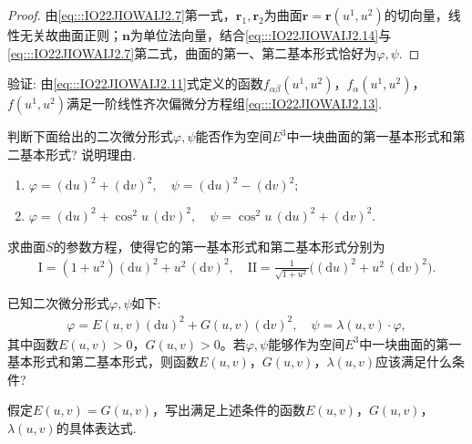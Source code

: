\documentclass[../../main.tex]{subfiles}%
\begin{document}
\begin{proof}
由\eqref{eq:::IO22JIOWAIJ2.7}第一式，$\boldsymbol{r}_1,\boldsymbol{r}_2$为曲面$\boldsymbol{r}=\boldsymbol{r}(u^1,u^2)$的切向量，线性无关故曲面正则；$\boldsymbol{n}$为单位法向量，结合\eqref{eq:::IO22JIOWAIJ2.14}与\eqref{eq:::IO22JIOWAIJ2.7}第二式，曲面的第一、第二基本形式恰好为$\varphi,\psi$.

\end{proof}

\begin{example}
验证: 由\eqref{eq:::IO22JIOWAIJ2.11}式定义的函数$f_{\alpha\beta}(u^1,u^2)$，$f_\alpha(u^1,u^2)$，$f(u^1,u^2)$满足一阶线性齐次偏微分方程组\eqref{eq:::IO22JIOWAIJ2.13}.
\end{example}

\begin{example}
判断下面给出的二次微分形式$\varphi,\psi$能否作为空间$E^3$中一块曲面的第一基本形式和第二基本形式? 说明理由.
\begin{enumerate}[(1)]
\item $\varphi=(\mathrm{d}u)^2+(\mathrm{d}v)^2,\quad \psi=(\mathrm{d}u)^2-(\mathrm{d}v)^2;$
\item $\varphi=(\mathrm{d}u)^2+\cos^2 u\,(\mathrm{d}v)^2,\quad \psi=\cos^2 u\,(\mathrm{d}u)^2+(\mathrm{d}v)^2.$
\end{enumerate}
\end{example}

\begin{example}
求曲面$S$的参数方程，使得它的第一基本形式和第二基本形式分别为
\begin{align*}
\mathrm{I}=(1+u^2)(\mathrm{d}u)^2+u^2\,(\mathrm{d}v)^2,\quad \mathrm{II}=\frac{1}{\sqrt{1+u^2}}\big((\mathrm{d}u)^2+u^2\,(\mathrm{d}v)^2\big).
\end{align*}
\end{example}

\begin{example}
已知二次微分形式$\varphi,\psi$如下:
\begin{align*}
\varphi=E(u,v)(\mathrm{d}u)^2+G(u,v)(\mathrm{d}v)^2,\quad \psi=\lambda(u,v)\cdot\varphi,
\end{align*}
其中函数$E(u,v)>0$，$G(u,v)>0$。若$\varphi,\psi$能够作为空间$E^3$中一块曲面的第一基本形式和第二基本形式，则函数$E(u,v)$，$G(u,v)$，$\lambda(u,v)$应该满足什么条件?

假定$E(u,v)=G(u,v)$，写出满足上述条件的函数$E(u,v)$，$G(u,v)$，$\lambda(u,v)$的具体表达式.
\end{example}
\end{document}
